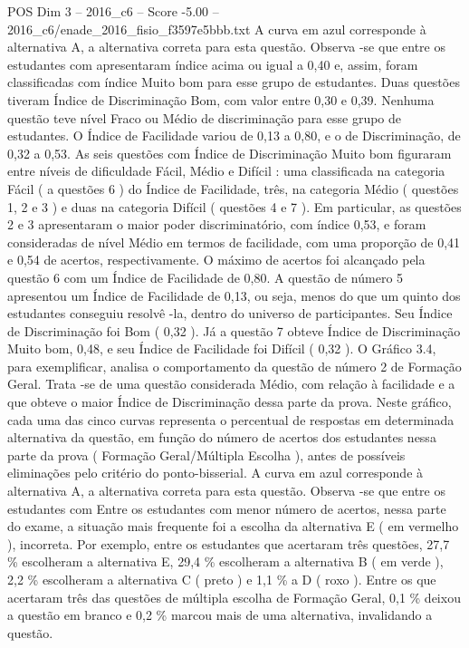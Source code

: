 \begin{textsample}{POS Dim 3 – 2016\_c6 – Score -5.00 – 2016\_c6/enade\_2016\_fisio\_f3597e5bbb.txt}
A curva em azul corresponde à alternativa A, a alternativa correta para esta questão.
Observa -se que entre os estudantes com apresentaram índice acima ou igual a 0,40 e, assim, foram classificadas com índice Muito bom para esse grupo de estudantes.
Duas questões tiveram Índice de Discriminação Bom, com valor entre 0,30 e 0,39.
Nenhuma questão teve nível Fraco ou Médio de discriminação para esse grupo de estudantes.
O Índice de Facilidade variou de 0,13 a 0,80, e o de Discriminação, de 0,32 a 0,53.
As seis questões com Índice de Discriminação Muito bom figuraram entre níveis de dificuldade Fácil, Médio e Difícil : uma classificada na categoria Fácil ( a questões 6 ) do Índice de Facilidade, três, na categoria Médio ( questões 1, 2 e 3 ) e duas na categoria Difícil ( questões 4 e 7 ).
Em particular, as questões 2 e 3 apresentaram o maior poder discriminatório, com índice 0,53, e foram consideradas de nível Médio em termos de facilidade, com uma proporção de 0,41 e 0,54 de acertos, respectivamente.
O máximo de acertos foi alcançado pela questão 6 com um Índice de Facilidade de 0,80.
A questão de número 5 apresentou um Índice de Facilidade de 0,13, ou seja, menos do que um quinto dos estudantes conseguiu resolvê -la, dentro do universo de participantes.
Seu Índice de Discriminação foi Bom ( 0,32 ).
Já a questão 7 obteve Índice de Discriminação Muito bom, 0,48, e seu Índice de Facilidade foi Difícil ( 0,32 ).
O Gráfico 3.4, para exemplificar, analisa o comportamento da questão de número 2 de Formação Geral.
Trata -se de uma questão considerada Médio, com relação à facilidade e a que obteve o maior Índice de Discriminação dessa parte da prova.
Neste gráfico, cada uma das cinco curvas representa o percentual de respostas em determinada alternativa da questão, em função do número de acertos dos estudantes nessa parte da prova ( Formação Geral/Múltipla Escolha ), antes de possíveis eliminações pelo critério do ponto-bisserial.
A curva em azul corresponde à alternativa A, a alternativa correta para esta questão.
Observa -se que entre os estudantes com Entre os estudantes com menor número de acertos, nessa parte do exame, a situação mais frequente foi a escolha da alternativa E ( em vermelho ), incorreta.
Por exemplo, entre os estudantes que acertaram três questões, 27,7 \% escolheram a alternativa E, 29,4 \% escolheram a alternativa B ( em verde ), 2,2 \% escolheram a alternativa C ( preto ) e 1,1 \% a D ( roxo ).
Entre os que acertaram três das questões de múltipla escolha de Formação Geral, 0,1 \% deixou a questão em branco e 0,2 \% marcou mais de uma alternativa, invalidando a questão.

\end{textsample}
